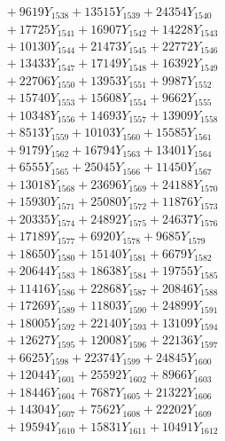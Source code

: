 \documentclass[a4paper,10pt]{article}
\begin{document}
{\begin{align}
&\;  + 9619 Y_{1538} + 13515 Y_{1539} + 24354 Y_{1540} \\[0.3ex]
&\;  + 17725 Y_{1541} + 16907 Y_{1542} + 14228 Y_{1543} \\[0.3ex]
&\;  + 10130 Y_{1544} + 21473 Y_{1545} + 22772 Y_{1546} \\[0.3ex]
&\;  + 13433 Y_{1547} + 17149 Y_{1548} + 16392 Y_{1549} \\[0.3ex]
&\;  + 22706 Y_{1550} + 13953 Y_{1551} + 9987 Y_{1552} \\[0.3ex]
&\;  + 15740 Y_{1553} + 15608 Y_{1554} + 9662 Y_{1555} \\[0.3ex]
&\;  + 10348 Y_{1556} + 14693 Y_{1557} + 13909 Y_{1558} \\[0.5ex]\allowbreak
&\;  + 8513 Y_{1559} + 10103 Y_{1560} + 15585 Y_{1561} \\[0.3ex]
&\;  + 9179 Y_{1562} + 16794 Y_{1563} + 13401 Y_{1564} \\[0.3ex]
&\;  + 6555 Y_{1565} + 25045 Y_{1566} + 11450 Y_{1567} \\[0.3ex]
&\;  + 13018 Y_{1568} + 23696 Y_{1569} + 24188 Y_{1570} \\[0.3ex]
&\;  + 15930 Y_{1571} + 25080 Y_{1572} + 11876 Y_{1573} \\[0.3ex]
&\;  + 20335 Y_{1574} + 24892 Y_{1575} + 24637 Y_{1576} \\[0.3ex]
&\;  + 17189 Y_{1577} + 6920 Y_{1578} + 9685 Y_{1579} \\[0.3ex]
&\;  + 18650 Y_{1580} + 15140 Y_{1581} + 6679 Y_{1582} \\[0.3ex]
&\;  + 20644 Y_{1583} + 18638 Y_{1584} + 19755 Y_{1585} \\[0.3ex]
&\;  + 11416 Y_{1586} + 22868 Y_{1587} + 20846 Y_{1588} \\[0.5ex]\allowbreak
&\;  + 17269 Y_{1589} + 11803 Y_{1590} + 24899 Y_{1591} \\[0.3ex]
&\;  + 18005 Y_{1592} + 22140 Y_{1593} + 13109 Y_{1594} \\[0.3ex]
&\;  + 12627 Y_{1595} + 12008 Y_{1596} + 22136 Y_{1597} \\[0.3ex]
&\;  + 6625 Y_{1598} + 22374 Y_{1599} + 24845 Y_{1600} \\[0.3ex]
&\;  + 12044 Y_{1601} + 25592 Y_{1602} + 8966 Y_{1603} \\[0.3ex]
&\;  + 18446 Y_{1604} + 7687 Y_{1605} + 21322 Y_{1606} \\[0.3ex]
&\;  + 14304 Y_{1607} + 7562 Y_{1608} + 22202 Y_{1609} \\[0.3ex]
&\;  + 19594 Y_{1610} + 15831 Y_{1611} + 10491 Y_{1612} \\[0.3ex]

\end{align}}
\end{document}
